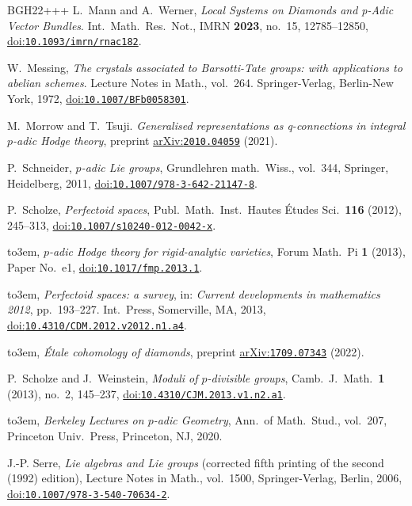 \documentclass[10pt,a4paper]{article}
\newcommand{\doi}[1]{\href{https://doi.org/#1}{doi:\nolinkurl{#1}}}
\newcommand{\arXiv}[1]{\href{https://arxiv.org/abs/#1}{arXiv:\nolinkurl{#1}}}
\providecommand{\bysame}{\leavevmode\hbox to3em{\hrulefill}\thinspace}
\theoremstyle{definition}
\theoremstyle{remark}
\numberwithin{equation}{section}
\begin{document}
\begin{thebibliography}{BGH{\etalchar{+}}22+++}
L.~Mann and  A.~Werner, 
{\em {L}ocal {S}ystems on {D}iamonds and p-{A}dic {V}ector {B}undles}.  Int.\ Math.\ Res.\ Not., IMRN \textbf{2023}, no.~15, 12785--12850, \doi{10.1093/imrn/rnac182}.

W.~Messing, 
{\em {T}he crystals associated to {B}arsotti-{T}ate groups: with applications to abelian schemes}.  Lecture Notes in Math., vol.~264. Springer-Verlag, Berlin-New York, 1972, \doi{10.1007/BFb0058301}.
	
M.~Morrow and T.~Tsuji.
{\em Generalised representations as q-connections in integral $p$-adic {H}odge theory}, preprint \arXiv{2010.04059} (2021).
		
P.~Schneider, 
{\em {$p$}-adic {L}ie groups}, Grundlehren math.\ Wiss., vol.~344, Springer, Heidelberg, 2011, \doi{10.1007/978-3-642-21147-8}.
	
P.~Scholze, 
{\em {P}erfectoid spaces}, Publ.\ Math.\ Inst.\ Hautes \'{E}tudes Sci.\ \textbf{116} (2012), 245--313, \doi{10.1007/s10240-012-0042-x}.
	
\bysame, 
       {\em {$p$}-adic {H}odge theory for rigid-analytic varieties}, Forum Math.\ Pi \textbf{1} (2013), Paper No.~e1,  \doi{10.1017/fmp.2013.1}.
	
\bysame, 
{\em {P}erfectoid spaces: a survey}, in: {\em Current developments in mathematics 2012}, pp.~193--227.  Int.\ Press, Somerville, MA, 2013, \doi{10.4310/CDM.2012.v2012.n1.a4}.
	
\bysame, 
{\em {\'E}tale cohomology of diamonds}, preprint \arXiv{1709.07343} (2022).

P.~Scholze and  J.~Weinstein, 
{\em {M}oduli of {$p$}-divisible groups}, Camb.\ J.~Math.\ \textbf{1} (2013), no.~2, 145--237, \doi{10.4310/CJM.2013.v1.n2.a1}.
	
\bysame, 
{\em {B}erkeley {L}ectures on $p$-adic {G}eometry}, Ann.\ of Math.\ Stud., vol.~207, Princeton Univ.\ Press, Princeton, NJ, 2020.
       
J.-P. Serre, 
{\em Lie algebras and {L}ie groups} (corrected fifth printing of the second (1992) edition), Lecture Notes in Math., vol.~1500, Springer-Verlag, Berlin, 2006, \doi{10.1007/978-3-540-70634-2}.


\end{thebibliography}
\end{document}
